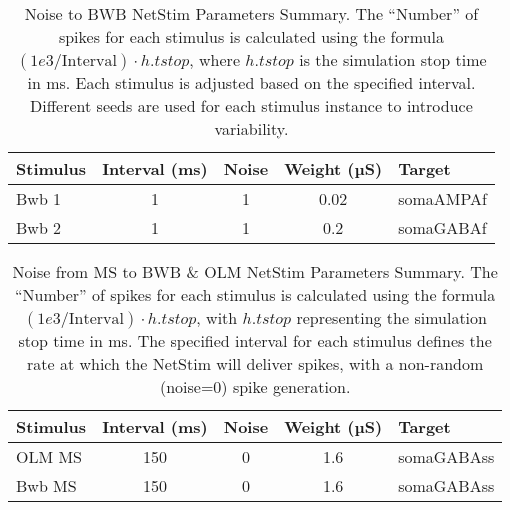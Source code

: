 \begin{table}[htbp]
    \centering
    \caption[Noise to BWB Parameters]{Noise to BWB NetStim Parameters Summary.
        The ``Number'' of spikes for each stimulus is calculated using the formula \((1e3 / \text{Interval}) \cdot h.tstop\),
        where \(h.tstop\) is the simulation stop time in ms. Each stimulus is adjusted based on the specified interval.
        Different seeds are used for each stimulus instance to introduce variability.}\label{tab:noise_to_BWB}
    \begin{tabular}{lcccl}
        \hline
        Stimulus & Interval (ms) & Noise & Weight (µS) & Target \\
        \hline
        Bwb 1             & 1                      & 1              & 0.02                 & somaAMPAf       \\
        Bwb 2             & 1                      & 1              & 0.2                  & somaGABAf       \\
        \hline
    \end{tabular}
\end{table}

\begin{table}[htbp]
    \centering
    \caption[Noise from MS to BWB \& OLM Parameters]{Noise from MS to BWB \& OLM NetStim Parameters Summary.
        The ``Number'' of spikes for each stimulus is calculated using the formula \((1e3 / \text{Interval}) \cdot h.tstop\),
        with \(h.tstop\) representing the simulation stop time in ms.
        The specified interval for each stimulus defines the rate at which the NetStim will deliver spikes,
        with a non-random (noise=0) spike generation.}\label{tab:noise_from_MS_to_BWB_OLM}
    \begin{tabular}{lcccl}
        \hline
        Stimulus & Interval (ms) & Noise & Weight (µS) & Target \\
        \hline
        OLM MS            & 150                    & 0              & 1.6                  & somaGABAss      \\
        Bwb MS            & 150                    & 0              & 1.6                  & somaGABAss      \\
        \hline
    \end{tabular}
\end{table}
